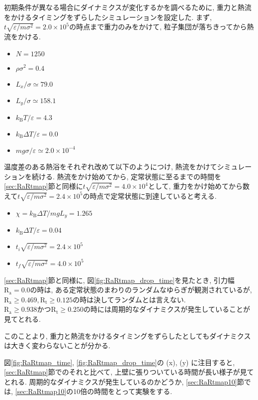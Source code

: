 初期条件が異なる場合にダイナミクスが変化するかを調べるために, 重力と熱流をかけるタイミングをずらしたシミュレーションを設定した. まず, $t \sqrt{\varepsilon / m \sigma^2} = 2.0 \times 10^{5}$の時点まで重力のみをかけて, 粒子集団が落ちきってから熱流をかける. 

\begin{itemize}
  \item $N = 1250$
  \item $\rho \sigma^2 = 0.4$
  \item $L_x / \sigma \simeq 79.0$
  \item $L_y / \sigma \simeq 158.1$
  \item $k_{\text{B}} T/\varepsilon = 4.3$
  \item $k_{\text{B}} \Delta T/\varepsilon = 0.0$
  \item $mg\sigma/\varepsilon \simeq 2.0 \times 10^{-4}$
\end{itemize}

温度差のある熱浴をそれぞれ改めて以下のようにつけ, 熱流をかけてシミュレーションを続ける. 熱流をかけ始めてから, 定常状態に至るまでの時間を\ref{sec:RaRtmap}節と同様に$t \sqrt{\varepsilon / m \sigma^2} = 4.0 \times 10^{4}$として, 重力をかけ始めてから数えて$t \sqrt{\varepsilon / m \sigma^2} = 2.4 \times 10^{5}$の時点で定常状態に到達していると考える. 

\begin{itemize}
  \item $\chi = k_{\text{B}}\Delta T / mg L_y = 1.265$
  \item $k_{\text{B}} \Delta T/\varepsilon = 0.04$
  \item $t_i \sqrt{\varepsilon / m \sigma^2} = 2.4 \times 10^{5}$
  \item $t_f \sqrt{\varepsilon / m \sigma^2} = 4.0 \times 10^{5}$
\end{itemize}



\ref{sec:RaRtmap}節と同様に, 図\ref{fig:RaRtmap_drop_time}を見たとき, 引力幅$\text{R}_\text{a}=0.0$の時は, ある定常状態のまわりのランダムなゆらぎが観測されているが, $\text{R}_\text{a} \ge 0.469, \text{R}_\text{t} \ge 0.125$の時は決してランダムとは言えない. $\text{R}_\text{a} \ge 0.938 かつ\text{R}_\text{t} \ge 0.250$の時には周期的なダイナミクスが発生していることが見てとれる.  

このことより, 重力と熱流をかけるタイミングをずらしたとしてもダイナミクスは大きく変わらないことが分かる. 

図\ref{fig:RaRtmap_time}, \ref{fig:RaRtmap_drop_time}の (x), (y) に注目すると, \ref{sec:RaRtmap}節でのそれと比べて, 上壁に張りついている時間が長い様子が見てとれる. 周期的なダイナミクスが発生しているのかどうか, \ref{sec:RaRtmap10}節では, \ref{sec:RaRtmap10}の10倍の時間をとって実験をする. 


